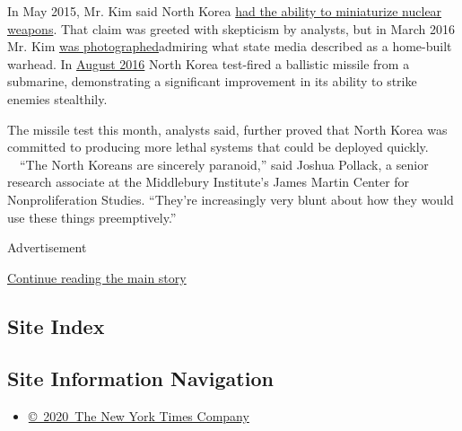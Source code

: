 In May 2015, Mr. Kim said North Korea
\href{https://www.nytimes3xbfgragh.onion/2015/05/21/world/asia/north-korea-claims-it-has-built-small-nuclear-warheads.html}{had
the ability to miniaturize nuclear weapons}. That claim was greeted with
skepticism by analysts, but in March 2016 Mr. Kim
\href{http://www.bbc.com/news/world-asia-35760797}{was
photographed}admiring what state media described as a home-built
warhead. In
\href{https://www.nytimes3xbfgragh.onion/2016/08/24/world/asia/north-korea-submarine-missile.html}{August
2016} North Korea test-fired a ballistic missile from a submarine,
demonstrating a significant improvement in its ability to strike enemies
stealthily.

The missile test this month, analysts said, further proved that North
Korea was committed to producing more lethal systems that could be
deployed quickly. ~~``The North Koreans are sincerely paranoid,'' said
Joshua Pollack, a senior research associate at the Middlebury
Institute's James Martin Center for Nonproliferation Studies. ``They're
increasingly very blunt about how they would use these things
preemptively.''

Advertisement

\protect\hyperlink{after-bottom}{Continue reading the main story}

\hypertarget{site-index}{%
\subsection{Site Index}\label{site-index}}

\hypertarget{site-information-navigation}{%
\subsection{Site Information
Navigation}\label{site-information-navigation}}

\begin{itemize}
\tightlist
\item
  \href{https://help.nytimes3xbfgragh.onion/hc/en-us/articles/115014792127-Copyright-notice}{©~2020~The
  New York Times Company}
\end{itemize}

